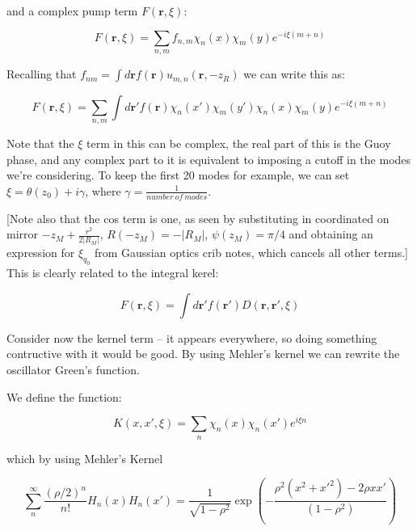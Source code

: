 \documentclass[a4paper,nobalancelastpage]{revtex4-1}
\newcommand{\vect}[1]{\bm{#1}}
\newcommand{\expn}[1] {e^{#1}}
\begin{document}
and a complex pump term $F(\vect{r},\xi)$:

\begin{equation}
F(\vect{r},\xi)= \sum_{n,m} f_{n,m} \chi_{n}\left( x \right)
  \chi_{m}\left( y \right) \expn{-i \xi (m+n)}
\end{equation}

Recalling that $f_{nm}=\int d\vect{r} f(\vect{r}) u_{m,n}(\vect{r},-z_R)$ we can write this as:

\begin{equation}
F(\vect{r},\xi)= \sum_{n,m} \int d\vect{r}' f(\vect{r}) \chi_{n}\left( x' \right)
  \chi_{m}\left( y' \right) \chi_{n}\left( x \right)
  \chi_{m}\left( y \right) \expn{-i \xi (m+n)}
\end{equation}

Note that the $\xi$ term in this can be complex, the real part of this is the Guoy phase, and any complex part to it is equivalent to imposing a cutoff in the modes we're considering. To keep the first 20 modes for example, we can set $\xi=\theta(z_0)+i \gamma$, where $\gamma=\frac{1}{number \ of \ modes}$.

[Note also that the cos term is one, as seen by substituting in coordinated on mirror $-z_M+\frac{r^2}{2|R_M|}$, $R(-z_M)=-|R_M|$, $\psi(z_M)=\pi/4$ and obtaining an expression for $\xi_{q_0}$ from Gaussian optics crib notes, which cancels all other terms.]
\\
This is clearly related to the integral kerel:

\begin{equation}
F(\vect{r},\xi)= \int d\vect{r}' f(\vect{r}') D(\vect{r},\vect{r}',\xi)
\end{equation}

Consider now the kernel term -- it appears everywhere, so doing something contructive with it would be good. By using Mehler's kernel we can rewrite the oscillator Green's function. 

We define the function:

\begin{equation}
\label{eq:kernInChis}
K(x,x',\xi)=\sum_{n} \chi_n (x) \chi_n (x') e^{i\xi n}
\end{equation}

which by using Mehler's Kernel

\begin{equation}
\sum_{n}^{\infty} \frac{(\rho/2)^n}{n!} H_n(x) H_n(x') = \frac{1}{\sqrt{1-\rho^2}}
\exp{\left(-
\frac{\rho^2(x^2+x'^2)-2\rho x x'}{(1-\rho^2)}\right)
}
\end{equation}
\end{document}
